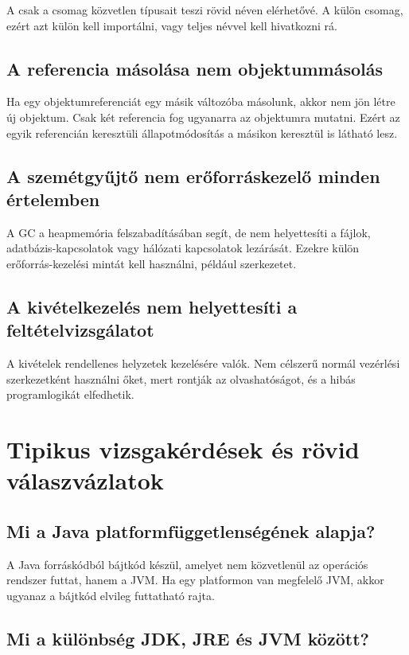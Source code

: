 A  csak a  csomag közvetlen típusait teszi rövid néven elérhetővé. A  külön csomag, ezért azt külön kell importálni, vagy teljes névvel kell hivatkozni rá.

\subsection{A referencia másolása nem objektummásolás}

Ha egy objektumreferenciát egy másik változóba másolunk, akkor nem jön létre új objektum. Csak két referencia fog ugyanarra az objektumra mutatni. Ezért az egyik referencián keresztüli állapotmódosítás a másikon keresztül is látható lesz.

\subsection{A szemétgyűjtő nem erőforráskezelő minden értelemben}

A GC a heapmemória felszabadításában segít, de nem helyettesíti a fájlok, adatbázis-kapcsolatok vagy hálózati kapcsolatok lezárását. Ezekre külön erőforrás-kezelési mintát kell használni, például  szerkezetet.

\subsection{A kivételkezelés nem helyettesíti a feltételvizsgálatot}

A kivételek rendellenes helyzetek kezelésére valók. Nem célszerű normál vezérlési szerkezetként használni őket, mert rontják az olvashatóságot, és a hibás programlogikát elfedhetik.

\section{Tipikus vizsgakérdések és rövid válaszvázlatok}

\subsection{Mi a Java platformfüggetlenségének alapja?}

A Java forráskódból bájtkód készül, amelyet nem közvetlenül az operációs rendszer futtat, hanem a JVM. Ha egy platformon van megfelelő JVM, akkor ugyanaz a bájtkód elvileg futtatható rajta.

\subsection{Mi a különbség JDK, JRE és JVM között?}

